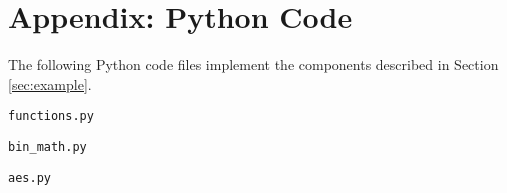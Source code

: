 \section{Appendix: Python Code}
\label{appendix:code}

The following Python code files implement the components described in Section \ref{sec:example}.

\texttt{functions.py}


\newpage
\texttt{bin\_math.py}


\newpage
\texttt{aes.py}

